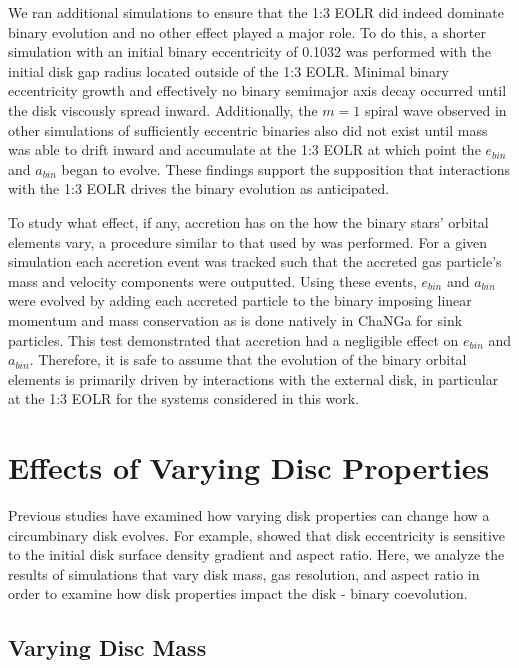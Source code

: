 We ran additional simulations to ensure that  the 1:3 EOLR did indeed dominate binary
evolution and no other effect played a major role.  To do this, a shorter simulation with an initial binary eccentricity of 0.1032 was performed
with the initial disk gap radius located outside of the 1:3 EOLR.
Minimal binary eccentricity growth and effectively no binary semimajor
axis decay occurred until the disk viscously spread inward.  Additionally, the $m = 1$ spiral wave observed in other simulations of sufficiently eccentric binaries also did not exist until mass was able to drift inward and accumulate at the 1:3 EOLR at which point the $e_{bin}$ and $a_{bin}$ began to evolve.  These findings support the supposition that interactions with the 1:3 EOLR drives the binary evolution as anticipated.

To study what effect, if any, accretion has on the how the binary stars' orbital elements vary, a procedure similar to that used by \citet{Roedig12} 
was performed.  For a given simulation each accretion event was tracked such that the accreted gas particle's mass and velocity components were
outputted.  Using these events, $e_{bin}$ and $a_{bin}$ were evolved by adding each accreted particle to the binary imposing linear
momentum and mass conservation as is done natively in ChaNGa for sink particles.  This test demonstrated that accretion 
had a negligible effect on $e_{bin}$ and $a_{bin}$.  Therefore, it is safe to assume that the evolution of the binary orbital elements is primarily driven by interactions with the external disk, in particular at the 1:3 EOLR for the systems considered in this work.


\section{Effects of Varying Disc Properties} \label{VaryingDiscProps}

Previous studies have examined how varying disk properties can change
how a circumbinary disk evolves.  For example, \citet{Lines15} showed
that disk eccentricity is sensitive to the initial disk surface
density gradient and aspect ratio.  Here, we analyze the results of simulations that vary disk mass, gas resolution, and
aspect ratio in order to examine how disk properties impact the disk - binary coevolution.


\subsection{Varying Disc Mass} \label{VaryingDiscMass}

